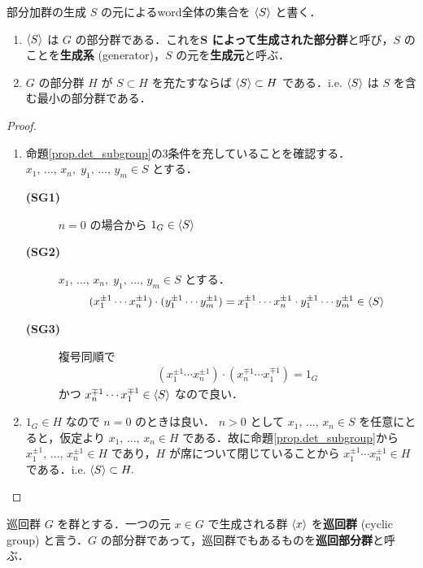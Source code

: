 \documentclass[geometry_main]{subfiles}
\begin{document}
\begin{myprop}[label=prop:group-word]{部分加群の生成}
	$S$ の元によるword全体の集合を $\expval{S}$ と書く．
	\begin{enumerate}
		\item $\expval{S}$ は $G$ の部分群である．これを\textbf{$\bm{S}$ によって生成された部分群}と呼び，$S$ のことを\textbf{生成系} (generator)，$S$ の元を\textbf{生成元}と呼ぶ．
		\item $G$ の部分群 $H$ が $S \subset H$ を充たすならば $\expval{S} \subset H$ である．i.e. $\expval{S}$ は $S$ を含む最小の部分群である．
	\end{enumerate}
\end{myprop}
\begin{proof}
	\begin{enumerate}
		\item 命題\ref{prop.det_subgroup}の3条件を充していることを確認する．$x_1,\, \dots ,\, x_n,\; y_1 ,\, \dots ,\, y_m \in S$ とする．
		\begin{description}
			\item[\textbf{(SG1)}] $n=0$ の場合から $1_G \in \expval{S}$
			\item[\textbf{(SG2)}] $x_1,\, \dots ,\, x_n,\; y_1 ,\, \dots ,\, y_m \in S$ とする．
			\begin{align}
				(x_1^{\pm 1} \cdots x_n^{\pm 1}) \cdot (y_1^{\pm 1} \cdots y_m^{\pm 1}) = x_1^{\pm 1} \cdots x_n^{\pm 1}\cdot y_1^{\pm 1} \cdots y_m^{\pm 1} \in \expval{S}
			\end{align}
			\item[\textbf{(SG3)}] 複号同順で
			\begin{align}
				(x_1^{\pm 1} \cdots x_n^{\pm 1}) \cdot (x_n^{\mp 1} \cdots x_1^{\mp 1}) = 1_G
			\end{align}
			かつ $x_n^{\mp 1} \cdots x_1^{\mp 1} \in \expval{S}$ なので良い．
		\end{description}
		\item $1_G \in H$ なので $n=0$ のときは良い．
		$n > 0$ として $x_1, \, \dots ,\, x_n \in S$ を任意にとると，仮定より $x_1,\, \dots ,\, x_n \in H$ である．故に命題\ref{prop.det_subgroup}から $x_1^{\pm 1},\, \dots ,\, x_n^{\pm 1} \in H$ であり，$H$ が席について閉じていることから $x_1^{\pm 1} \cdots x_n^{\pm 1} \in H$ である．i.e. $\expval{S} \subset H.$
	\end{enumerate}
\end{proof}

\begin{mydef}[label=def:group-cyclic]{巡回群}
	$G$ を群とする．一つの元 $x \in G$ で生成される群 $\expval{x}$ を\textbf{巡回群} (cyclic group) と言う．$G$ の部分群であって，巡回群でもあるものを\textbf{巡回部分群}と呼ぶ．
\end{mydef}
\end{document}
